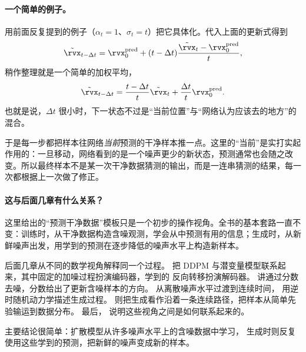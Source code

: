 \paragraph{一个简单的例子。}用前面反复提到的例子（$\alpha_t=1$、$\sigma_t=t$）把它具体化。代入上面的更新式得到
\[
\tilde{\rvx}_{t-\Delta t}
=
\rvx_0^{\mathrm{pred}}
+
(t-\Delta t)
\frac{
\tilde{\rvx}_t-\rvx_0^{\mathrm{pred}}
}{
t
},
\]
稍作整理就是一个简单的加权平均，
\[
\tilde{\rvx}_{t-\Delta t}
=
\frac{t-\Delta t}{t}\tilde{\rvx}_t
+
\frac{\Delta t}{t}\rvx_0^{\mathrm{pred}}.
\]
也就是说，$\Delta t$ 很小时，下一状态不过是“当前位置”与“网络认为应该去的地方”的混合。

于是每一步都把样本往网络\emph{当前}预测的干净样本推一点。这里的“当前”是实打实起作用的：一旦移动，网络看到的是一个噪声更少的新状态，预测通常也会随之改变。所以最终样本不是某一次干净数据猜测的输出，而是一连串猜测的结果，每一次都根据上一次做了修正。

\paragraph{这与后面几章有什么关系？}

这里给出的“预测干净数据”模板只是一个初步的操作视角。全书的基本套路一直不变：训练时，从干净数据构造含噪观测，学会从中预测有用的信息；生成时，从新鲜噪声出发，用学到的预测在逐步降低的噪声水平上构造新样本。

后面几章从不同的数学视角解释同一个过程。 把 DDPM 与潜变量模型联系起来，其中固定的加噪过程扮演编码器，学到的
反向转移扮演解码器。
 讲通过分数去噪，分数给出了更新含噪样本的方向。
 从离散噪声水平过渡到连续时间，
用逆时随机动力学描述生成过程。
 则把生成看作沿着一条连续路径，把样本从简单先验输运到数据分布。
最后， 说明这些视角之间是如何联系起来的。

主要结论很简单：扩散模型从许多噪声水平上的含噪数据中学习，
生成时则反复使用这些学到的预测，把新鲜的噪声变成新的样本。
